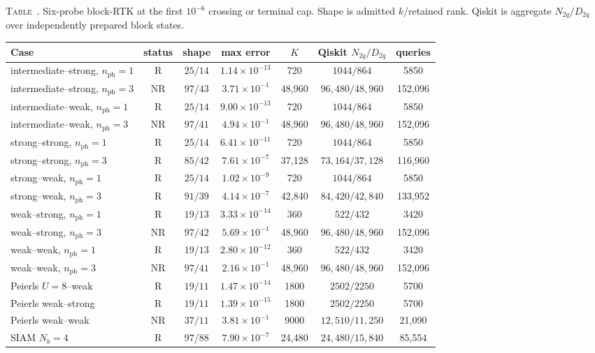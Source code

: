 \documentclass[
  reprint,
  amsmath,
  amssymb,
  aps,
  pra,
  nofootinbib,
  superscriptaddress,
  floatfix
]{revtex4-2}
\newcommand{\nph}{n_{\mathrm{ph}}}
\newcommand{\inlinetablecaption}[2]{%
  \refstepcounter{table}\label{#1}%
  \noindent\textsc{Table~\thetable.} #2\par\vspace{0.6ex}%
}
\begin{document}
\begin{widetext}
\inlinetablecaption{tab:block_krylov_resources}{Six-probe block-RTK at the
first $10^{-6}$ crossing or terminal cap.  Shape is admitted $k$/retained
rank.  Qiskit is aggregate $N_{2q}/D_{2q}$ over independently prepared block
states.}
\begin{center}
\scriptsize
\begin{tabular*}{\textwidth}{@{\extracolsep{\fill}}lcccccc@{}}
\toprule
Case & status & shape & max error & $K$ & Qiskit $N_{2q}/D_{2q}$ & queries \\
\midrule
intermediate--strong, $\nph=1$ & R & $25/14$ & $1.14\times10^{-13}$ & 720 & $1044/864$ & 5850 \\
intermediate--strong, $\nph=3$ & NR & $97/43$ & $3.71\times10^{-1}$ & 48,960 & $96{,}480/48{,}960$ & 152,096 \\
intermediate--weak, $\nph=1$ & R & $25/14$ & $9.00\times10^{-13}$ & 720 & $1044/864$ & 5850 \\
intermediate--weak, $\nph=3$ & NR & $97/41$ & $4.94\times10^{-1}$ & 48,960 & $96{,}480/48{,}960$ & 152,096 \\
strong--strong, $\nph=1$ & R & $25/14$ & $6.41\times10^{-11}$ & 720 & $1044/864$ & 5850 \\
strong--strong, $\nph=3$ & R & $85/42$ & $7.61\times10^{-7}$ & 37,128 & $73{,}164/37{,}128$ & 116,960 \\
strong--weak, $\nph=1$ & R & $25/14$ & $1.02\times10^{-9}$ & 720 & $1044/864$ & 5850 \\
strong--weak, $\nph=3$ & R & $91/39$ & $4.14\times10^{-7}$ & 42,840 & $84{,}420/42{,}840$ & 133,952 \\
weak--strong, $\nph=1$ & R & $19/13$ & $3.33\times10^{-14}$ & 360 & $522/432$ & 3420 \\
weak--strong, $\nph=3$ & NR & $97/42$ & $5.69\times10^{-1}$ & 48,960 & $96{,}480/48{,}960$ & 152,096 \\
weak--weak, $\nph=1$ & R & $19/13$ & $2.80\times10^{-12}$ & 360 & $522/432$ & 3420 \\
weak--weak, $\nph=3$ & NR & $97/41$ & $2.16\times10^{-1}$ & 48,960 & $96{,}480/48{,}960$ & 152,096 \\
Peierls $U=8$--weak & R & $19/11$ & $1.47\times10^{-14}$ & 1800 & $2502/2250$ & 5700 \\
Peierls weak--strong & R & $19/11$ & $1.39\times10^{-15}$ & 1800 & $2502/2250$ & 5700 \\
Peierls weak--weak & NR & $37/11$ & $3.81\times10^{-1}$ & 9000 & $12{,}510/11{,}250$ & 21,090 \\
SIAM $N_b=4$ & R & $97/88$ & $7.90\times10^{-7}$ & 24,480 & $24{,}480/15{,}840$ & 85,554 \\
\bottomrule
\end{tabular*}
\end{center}
\end{widetext}
\end{document}
